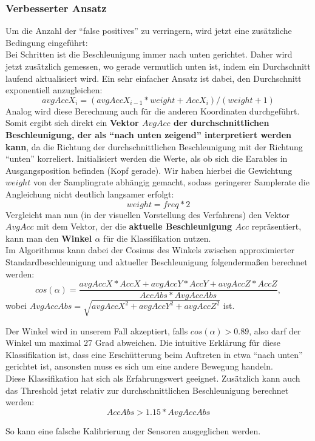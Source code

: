\documentclass[a4paper,12pt]{article}
\begin{document}
\subsubsection{Verbesserter Ansatz}
Um die Anzahl der ``false positives'' zu verringern, wird jetzt eine zusätzliche Bedingung eingeführt:\\
Bei Schritten ist die Beschleunigung immer nach unten gerichtet. Daher wird jetzt zusätzlich gemessen, wo gerade vermutlich unten ist, indem ein Durchschnitt laufend aktualisiert wird. Ein sehr einfacher Ansatz ist dabei, den Durchschnitt exponentiell anzugleichen:
\begin{equation}
	avgAccX_i = (avgAccX_{i-1} * weight + AccX_i) /(weight + 1)
\end{equation}
Analog wird diese Berechnung auch für die anderen Koordinaten durchgeführt. Somit ergibt sich direkt ein \textbf{Vektor $AvgAcc$ der durchschnittlichen Beschleunigung, der als ``nach unten zeigend'' interpretiert werden kann}, da die Richtung der durchschnittlichen Beschleunigung mit der Richtung ``unten'' korreliert. Initialisiert werden die Werte, als ob sich die Earables in Ausgangsposition befinden (Kopf gerade). Wir haben hierbei die Gewichtung $weight$ von der Samplingrate abhängig gemacht, sodass geringerer Samplerate die Angleichung nicht deutlich langsamer erfolgt:
\begin{equation}
	weight = freq * 2
\end{equation}
Vergleicht man nun (in der visuellen Vorstellung des Verfahrens) den Vektor $AvgAcc$ mit dem Vektor, der die \textbf{aktuelle Beschleunigung $Acc$} repräsentiert, kann man den \textbf{Winkel $\alpha$} für die Klassifikation nutzen.\\
Im Algorithmus kann dabei der Cosinus des Winkels zwischen approximierter Standardbeschleunigung und aktueller Beschleunigung folgendermaßen berechnet werden:
\begin{equation}
	cos(\alpha) = \frac{avgAccX * AccX + avgAccY * AccY + avgAccZ * AccZ}{ AccAbs * AvgAccAbs },
\end{equation}
wobei $AvgAccAbs = \sqrt{avgAccX^2+avgAccY^2+avgAccZ^2}$ ist.\\
\newline
\noindent
\begin{minipage}{0.5\textwidth}
	Der Winkel wird in unserem Fall akzeptiert, falls $cos(\alpha) > 0.89$, also darf der Winkel um maximal 27 Grad abweichen. Die intuitive Erklärung für diese Klassifikation ist, dass eine Erschütterung beim Auftreten in etwa ``nach unten'' gerichtet ist, ansonsten muss es sich um eine andere Bewegung handeln.\\ 
	Diese Klassifikation hat sich als Erfahrungswert geeignet.
	Zusätzlich kann auch das Threshold jetzt relativ zur durchschnittlichen Beschleunigung berechnet werden:
	\begin{equation}
		AccAbs > 1.15 * AvgAccAbs
	\end{equation}
	
	So kann eine falsche Kalibrierung der Sensoren ausgeglichen werden.
\end{minipage}
\end{document}
